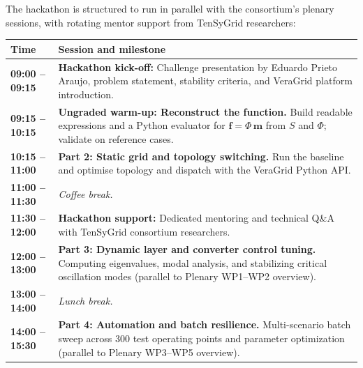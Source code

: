 \documentclass[11pt,a4paper]{article}
\begin{document}
The hackathon is structured to run in parallel with the consortium's plenary sessions, with rotating mentor support from TenSyGrid researchers:

\begin{table}[H]
  \centering
  \small
  \renewcommand{\arraystretch}{0.90}
  \begin{tabularx}{\textwidth}{lX}
    \toprule
    \textbf{\color{tgblue}Time} & \textbf{\color{tgblue}Session and milestone}                                                                                                                                              \\
    \midrule
    \textbf{09:00 -- 09:15}     & \textbf{Hackathon kick-off:} Challenge presentation by Eduardo Prieto Araujo, problem statement, stability criteria, and VeraGrid platform introduction.                                  \\
    \textbf{09:15 -- 10:15} & \textbf{Ungraded warm-up: Reconstruct the function.} Build readable expressions and a Python evaluator for $\mathbf f=\Phi\,\mathbf m$ from $S$ and $\Phi$; validate on reference cases. \\
    \textbf{10:15 -- 11:00}     & \textbf{Part 2: Static grid and topology switching.} Run the baseline and optimise topology and dispatch with the VeraGrid Python API.                                           \\
    \textbf{11:00 -- 11:30}     & \textit{\color{tgpetrol}Coffee break.}                                                                                                                                                    \\
    \textbf{11:30 -- 12:00}     & \textbf{Hackathon support:} Dedicated mentoring and technical Q\&A with TenSyGrid consortium researchers.                                                                                 \\
    \textbf{12:00 -- 13:00}     & \textbf{Part 3: Dynamic layer and converter control tuning.} Computing eigenvalues, modal analysis, and stabilizing critical oscillation modes (parallel to Plenary WP1--WP2 overview). \\
    \textbf{13:00 -- 14:00}     & \textit{\color{tgpetrol}Lunch break.}                                                                                                                                                     \\
    \textbf{14:00 -- 15:30}     & \textbf{Part 4: Automation and batch resilience.} Multi-scenario batch sweep across 300 test operating points and parameter optimization (parallel to Plenary WP3--WP5 overview).       \\

\end{tabularx}
\end{table}
\end{document}
